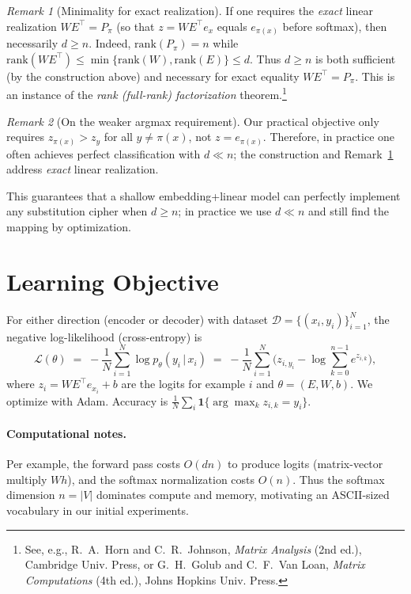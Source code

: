 \documentclass[12pt]{article}
\theoremstyle{plain}
\theoremstyle{remark}
\newtheorem{remark}{Remark}                      %
\begin{document}
\begin{remark}[Minimality for exact realization]\label{rem:minimality}
If one requires the \emph{exact} linear realization $WE^\top = P_\pi$ (so that
$z = WE^\top e_x$ equals $e_{\pi(x)}$ before softmax), then necessarily $d\ge n$.
Indeed, $\mathrm{rank}(P_\pi)=n$ while
$\mathrm{rank}(WE^\top)\le \min\{\mathrm{rank}(W),\mathrm{rank}(E)\}\le d$.
Thus $d\ge n$ is both sufficient (by the construction above) and necessary for
exact equality $WE^\top=P_\pi$.
This is an instance of the \emph{rank (full-rank) factorization} theorem.\footnote{See, e.g.,
R.~A.~Horn and C.~R.~Johnson, \emph{Matrix Analysis} (2nd ed.), Cambridge Univ. Press,
or G.~H.~Golub and C.~F.~Van Loan, \emph{Matrix Computations} (4th ed.), Johns Hopkins Univ. Press.}
\end{remark}

\begin{remark}[On the weaker argmax requirement]
Our practical objective only requires $z_{\pi(x)} > z_y$ for all $y\neq \pi(x)$, not $z=e_{\pi(x)}$.
Therefore, in practice one often achieves perfect classification with $d\ll n$; the construction
and Remark~\ref{rem:minimality} address \emph{exact} linear realization.
\end{remark}

This guarantees that a shallow embedding+linear model can perfectly implement any substitution cipher when $d\!\ge\!n$; in practice we use $d\ll n$ and still find the mapping by optimization.

\section{Learning Objective}
For either direction (encoder or decoder) with dataset $\mathcal{D}=\{(x_i,y_i)\}_{i=1}^N$, the negative log-likelihood (cross-entropy) is
\begin{equation}
\mathcal{L}(\theta) \;=\; -\frac{1}{N}\sum_{i=1}^{N}\log p_\theta(y_i\,|\,x_i)
\;=\; -\frac{1}{N}\sum_{i=1}^{N}\Big(z_{i,y_i} - \log\sum_{k=0}^{n-1} e^{z_{i,k}}\Big),
\end{equation}
where $z_i=W E^\top e_{x_i}+b$ are the logits for example $i$ and $\theta=(E,W,b)$. We optimize with Adam. Accuracy is $\tfrac{1}{N}\sum_i \mathbf{1}\{\arg\max_k z_{i,k}=y_i\}$.

\paragraph{Computational notes.}
Per example, the forward pass costs $O(dn)$ to produce logits (matrix-vector multiply $W h$), and the softmax normalization costs $O(n)$. Thus the softmax dimension $n=|V|$ dominates compute and memory, motivating an ASCII-sized vocabulary in our initial experiments.
\end{document}
